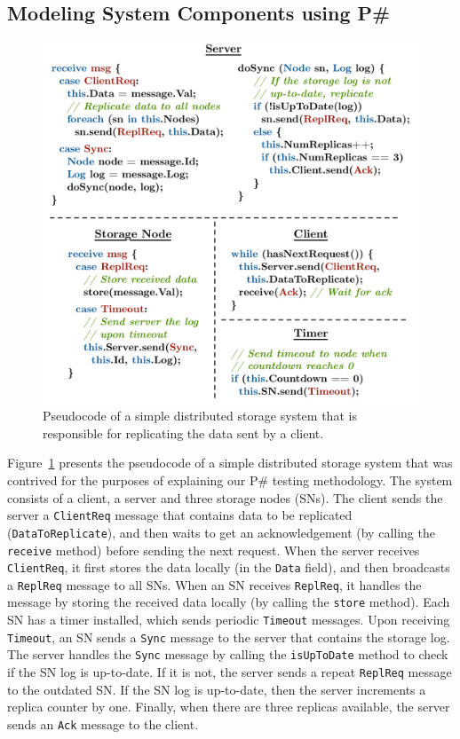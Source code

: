 \documentclass{llncs}
\newcommand{\ps}{P\#\xspace}
\begin{document}
\subsection{Modeling System Components using \ps}
\label{sec:advanced:modeling}

\begin{figure}[t]
\centering
\includegraphics[width=.7\linewidth]{figures/example_code}
\caption[Pseudocode of a simple distributed storage system]{Pseudocode of a simple distributed storage system that is responsible for replicating the data sent by a client.}
\label{fig:example}
\end{figure}

Figure~\ref{fig:example} presents the pseudocode of a simple distributed storage system that was contrived for the purposes of explaining our \ps testing methodology. The system consists of a client, a server and three storage nodes (SNs). The client sends the server a \texttt{ClientReq} message that contains data to be replicated (\texttt{DataToReplicate}), and then waits to get an acknowledgement (by calling the \texttt{receive} method) before sending the next request. When the server receives \texttt{ClientReq}, it first stores the data locally (in the \texttt{Data} field), and then broadcasts a \texttt{ReplReq} message to all SNs. When an SN receives \texttt{ReplReq}, it handles the message by storing the received data locally (by calling the \texttt{store} method). Each SN has a timer installed, which sends periodic \texttt{Timeout} messages. Upon receiving \texttt{Timeout}, an SN sends a \texttt{Sync} message to the server that contains the storage log. The server handles the \texttt{Sync} message by calling the \texttt{isUpToDate} method to check if the SN log is up-to-date. If it is not, the server sends a repeat \texttt{ReplReq} message to the outdated SN. If the SN log is up-to-date, then the server increments a replica counter by one. Finally, when there are three replicas available, the server sends an \texttt{Ack} message to the client.
\end{document}
